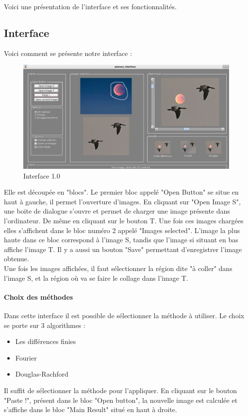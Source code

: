 Voici une présentation de l'interface et ses fonctionnalités.

\subsection{Interface}
Voici comment se présente notre interface : 
\begin{figure}[!h]
    \centering
    \includegraphics[scale = 0.3]{Images/interface.png}
    \caption{Interface 1.0}
\end{figure}{}
Elle est découpée en "blocs". Le premier bloc appelé "Open Button" se situe en haut à gauche, il permet l'ouverture d'images. En cliquant sur "Open Image S", une boite de dialogue s'ouvre et permet de charger une image présente dans l'ordinateur. De même en cliquant sur le bouton T. Une fois ces images chargées elles s'affichent dans le bloc numéro 2 appelé "Images selected". L'image la plus haute dans ce bloc correspond à l'image S, tandis que l'image si situant en bas affiche l'image T.
Il y a aussi un bouton "Save" permettant d'enregistrer l'image obtenue.\\ 
Une fois les images affichées, il faut sélectionner la région dite "à coller" dans l'image S, et la région où va se faire le collage dans l'image T.\\

\paragraph{Choix des méthodes}
Dans cette interface il est possible de sélectionner la méthode à utiliser. Le choix se porte sur 3 algorithmes : 
\begin{itemize}
    \item Les différences finies
    \item Fourier 
    \item Douglas-Rachford
\end{itemize}{}
Il suffit de sélectionner la méthode pour l'appliquer.
En cliquant sur le bouton "Paste !", présent dans le bloc "Open button", la nouvelle image est calculée et s'affiche dans le bloc "Main Result" situé en haut à droite. 
